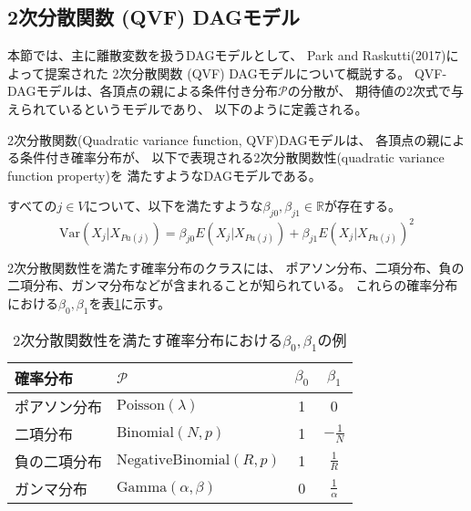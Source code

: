 
\subsection{2次分散関数 (QVF) DAGモデル}

本節では、主に離散変数を扱うDAGモデルとして、
Park and Raskutti(2017)\cite{Park2017-hw}によって提案された
2次分散関数 (QVF) DAGモデルについて概説する。
QVF-DAGモデルは、各頂点の親による条件付き分布$\mathcal P$の分散が、
期待値の2次式で与えられているというモデルであり、
以下のように定義される。

\begin{df}
2次分散関数(Quadratic variance function, QVF)DAGモデルは、
各頂点の親による条件付き確率分布が、
以下で表現される2次分散関数性(quadratic variance function property)を
満たすようなDAGモデルである。

すべての$j \in V$について、以下を満たすような$\beta_{j0}, \beta_{j1} \in \mathbb R$が存在する。
  \begin{equation}
      \mathrm{Var}(X_j|X_{Pa(j)}) = \beta_{j0} E(X_j | X_{Pa(j)}) + \beta_{j1} E(X_j | X_{Pa(j)})^2
      \label{QVF}
  \end{equation}
\end{df}

2次分散関数性を満たす確率分布のクラスには、
ポアソン分布、二項分布、負の二項分布、ガンマ分布などが含まれることが知られている。
これらの確率分布における$\beta_0, \beta_1$を表\ref{table:beta}に示す。

\begin{table}[ht]
  \begin{center}
    \caption{2次分散関数性を満たす確率分布における$\beta_0, \beta_1$の例}
    \begin{tabular}{llcc} \toprule
      確率分布     & $\mathcal{P}$                  & $\beta_0$ & $\beta_1$       \\ \midrule
      ポアソン分布  & $\text{Poisson}(\lambda)$      & 1         & 0               \\
      二項分布     & $\text{Binomial}(N, p)$        & 1         & $-\frac{1}{N}$   \\
      負の二項分布  & $\text{NegativeBinomial}(R,p)$ & 1         & $\frac{1}{R}$    \\
      ガンマ分布   & $\text{Gamma}(\alpha, \beta)$   & 0         & $\frac{1}{\alpha}$ \\ \bottomrule
    \end{tabular}
    \label{table:beta}
  \end{center}
\end{table}

